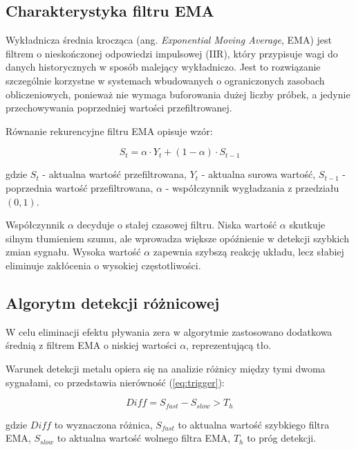 \subsection{Charakterystyka filtru EMA}

Wykładnicza średnia krocząca  (ang. \textit{Exponential Moving Average}, EMA) jest filtrem o nieskończonej odpowiedzi impulsowej (IIR), który przypisuje wagi do danych historycznych w sposób malejący wykładniczo. Jest to rozwiązanie szczególnie korzystne w systemach wbudowanych o ograniczonych zasobach obliczeniowych, ponieważ nie wymaga buforowania dużej liczby próbek, a jedynie przechowywania poprzedniej wartości przefiltrowanej.

Równanie rekurencyjne filtru EMA opisuje wzór:

\begin{equation}
    S_t = \alpha \cdot Y_t + (1 - \alpha) \cdot S_{t-1}
    \label{eq:ema}
\end{equation}

gdzie $S_t$ - aktualna wartość przefiltrowana, $Y_t$ - aktualna surowa wartość, $S_{t-1}$ - poprzednia wartość przefiltrowana, $\alpha$ - współczynnik wygładzania z przedziału $(0, 1)$.

Współczynnik $\alpha$ decyduje o stałej czasowej filtru. Niska wartość $\alpha$ skutkuje silnym tłumieniem szumu, ale wprowadza większe opóźnienie w detekcji szybkich zmian sygnału. Wysoka wartość $\alpha$ zapewnia szybszą reakcję układu, lecz słabiej eliminuje zakłócenia o wysokiej częstotliwości.

\subsection{Algorytm detekcji różnicowej}

W celu eliminacji efektu pływania zera w algorytmie zastosowano dodatkowa średnią z filtrem EMA o niskiej wartości $\alpha$, reprezentującą tło.

Warunek detekcji metalu opiera się na analizie różnicy między tymi dwoma sygnałami, co przedstawia nierówność (\ref{eq:trigger}):

\begin{equation}
    Diff=S_{fast} - S_{slow} > T_{h}
    \label{eq:trigger}
\end{equation}

gdzie $Diff$ to wyznaczona różnica, $S_{fast}$ to aktualna wartość szybkiego filtra EMA, $S_{slow}$ to aktualna wartość wolnego filtra EMA, $T_{h}$ to próg detekcji.

